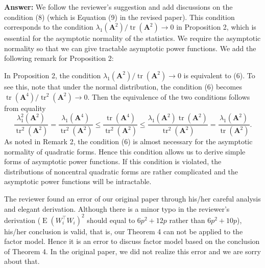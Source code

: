 \documentclass[11pt]{article}
\DeclareMathOperator{\mytr}{tr}
\DeclareMathOperator{\myE}{E}
\newcommand{\BA}{\mathbf{A}}    \newcommand{\BB}{\mathbf{B}}    \newcommand{\BC}{\mathbf{C}}    \newcommand{\BD}{\mathbf{D}}    \newcommand{\BE}{\mathbf{E}}    \newcommand{\BF}{\mathbf{F}}    \newcommand{\BG}{\mathbf{G}}    \newcommand{\BH}{\mathbf{H}}    \newcommand{\BI}{\mathbf{I}}    \newcommand{\BJ}{\mathbf{J}}    \newcommand{\BK}{\mathbf{K}}    \newcommand{\BL}{\mathbf{L}}
\theoremstyle{plain}
\theoremstyle{definition}
\theoremstyle{remark}
\begin{document}
\textbf{Answer:}
We follow the reviewer's suggestion and add discussions on the condition (8) (which is Equation (9) in the revised paper).
This condition corresponds to the condition $\lambda_1(\BA^2)/\mytr(\BA^2) \to 0$ in Proposition 2, which is essential for the asymptotic normality of the statistics.
We require the asymptotic normality so that we can give tractable asymptotic power functions.
We add the following remark for Proposition 2:
\begin{adjustwidth}{3em}{3em}
    In Proposition 2, the condition $\lambda_1(\BA^2) / \mytr(\BA^2) \to 0$ is equivalent to (6).
    To see this, note that under the normal distribution, the condition (6) becomes $\mytr(\BA^4)/ \mytr^2(\BA^2) \to 0$.
Then the equivalence of the two conditions follows from equality
\begin{equation*}
\frac{\lambda_1^2(\BA^2)}{\mytr^2(\BA^2)} 
=
\frac{\lambda_1(\BA^4)}{\mytr^2(\BA^2)} 
\leq
\frac{\mytr(\BA^4)}{\mytr^2(\BA^2)} \leq  
\frac{\lambda_1(\BA^2)\mytr(\BA^2)}{\mytr^2(\BA^2)}
=
\frac{\lambda_1(\BA^2)}{\mytr(\BA^2)}. 
\end{equation*}
As noted in Remark 2, the condition (6) is almost  necessary for the asymptotic normality of quadratic forms.
Hence this condition allows us to derive simple forms of asymptotic power functions. 
If this condition is violated, the distributions of noncentral quadratic forms are rather complicated and the asymptotic power functions will be intractable.
\end{adjustwidth}

The reviewer found an error of our original paper through his/her careful analysis and elegant derivation.
Although there is a minor typo in the reviewer's derivation ($\myE(W_i^\top W_i)^2$ should equal to $6p^2 + 12p$ rather than $6p^2 +10p$), his/her conclusion is valid, that is, our Theorem 4 can not be applied to the factor model.
Hence it is an error to discuss factor model based on the conclusion of Theorem 4.
In the original paper, we did not realize this error and we are sorry about that.
\end{document}
